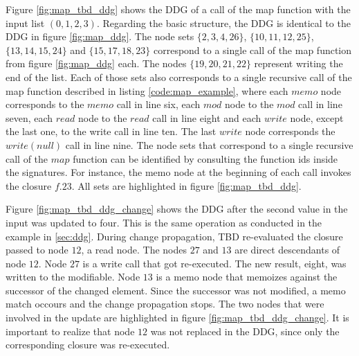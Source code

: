 Figure \ref{fig:map_tbd_ddg} shows the DDG of a call of the map function with the input list $(0, 1, 2, 3)$. Regarding the basic structure, the DDG is identical to the DDG in figure \ref{fig:map_ddg}. The node sets $\{2, 3, 4, 26\}$, $\{10, 11, 12, 25\}$, $\{13, 14, 15, 24\}$ and $\{15, 17, 18, 23\}$ correspond to a single call of the map function from figure \ref{fig:map_ddg} each. The nodes $\{19, 20, 21, 22\}$ represent writing the end of the list. Each of those sets also corresponds to a single recursive call of the map function described in listing \ref{code:map_example}, where each $memo$ node corresponds to the $memo$ call in line six, each $mod$ node to the $mod$ call in line seven, each $read$ node to the $read$ call in line eight and each $write$ node, except the last one, to the write call in line ten. The last $write$ node corresponds the $write(null)$ call in line nine. The node sets that correspond to a single recursive call of the $map$ function can be identified by consulting the function ids inside the signatures. For instance, the memo node at the beginning of each call invokes the closure $f.23$. All sets are highlighted in figure \ref{fig:map_tbd_ddg}.

Figure \ref{fig:map_tbd_ddg_change} shows the DDG after the second value in the input was updated to four. This is the same operation as conducted in the example in \ref{sec:ddg}. During change propagation, TBD re-evaluated the closure passed to node $12$, a read node. The nodes $27$ and $13$ are direct descendants of node $12$. Node $27$ is a write call that got re-executed. The new result, eight, was written to the modifiable. Node $13$ is a memo node that memoizes against the successor of the changed element. Since the successor was not modified, a memo match occours and the change propagation stops. The two nodes that were involved in the update are highlighted in figure \ref{fig:map_tbd_ddg_change}. It is important to realize that node $12$ was not replaced in the DDG, since only the corresponding closure was re-executed. 



